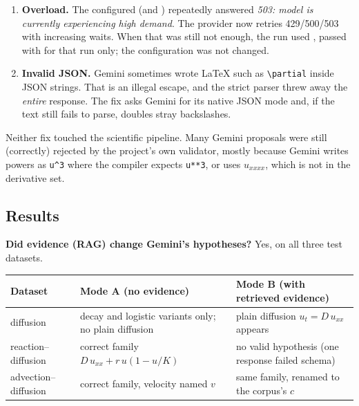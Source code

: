 \begin{enumerate}
  \item \textbf{Overload.} The configured  (and ) repeatedly answered
        \emph{503: model is currently experiencing high demand}. The provider now retries 429/500/503 with
        increasing waits. When that was still not enough, the run used , passed with
         for that run only; the configuration was not changed.
  \item \textbf{Invalid JSON.} Gemini sometimes wrote \LaTeX{} such as \verb|\partial| inside JSON strings.
        That is an illegal escape, and the strict parser threw away the \emph{entire} response. The fix asks Gemini
        for its native JSON mode and, if the text still fails to parse, doubles stray backslashes.
\end{enumerate}
Neither fix touched the scientific pipeline. Many Gemini proposals were still (correctly) rejected by the project's
own validator, mostly because Gemini writes powers as \texttt{u\^{}3} where the compiler expects \texttt{u**3},
or uses $u_{xxxx}$, which is not in the derivative set.

\subsection{Results}

\textbf{Did evidence (RAG) change Gemini's hypotheses?} Yes, on all three test datasets.
\begin{center}
\small
\begin{tabular}{@{}p{2.8cm}p{5.6cm}p{5.6cm}@{}}
\toprule
\textbf{Dataset} & \textbf{Mode A (no evidence)} & \textbf{Mode B (with retrieved evidence)} \\ \midrule
diffusion & decay and logistic variants only; no plain diffusion & plain diffusion $u_t=D\,u_{xx}$ appears \\
reaction--diffusion & correct family $D\,u_{xx} + r\,u(1-u/K)$ & no valid hypothesis (one response failed schema) \\
advection--diffusion & correct family, velocity named $v$ & same family, renamed to the corpus's $c$ \\
\bottomrule
\end{tabular}
\end{center}

